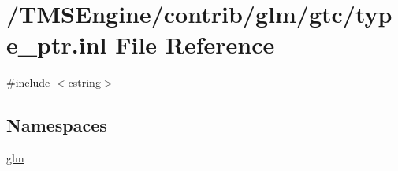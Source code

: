 \hypertarget{type__ptr_8inl}{}\section{/\+T\+M\+S\+Engine/contrib/glm/gtc/type\+\_\+ptr.inl File Reference}
\label{type__ptr_8inl}
{\ttfamily \#include $<$cstring$>$}\newline
\subsection*{Namespaces}
\begin{DoxyCompactItemize}
\item 
 \hyperlink{namespaceglm}{glm}
\end{DoxyCompactItemize}
